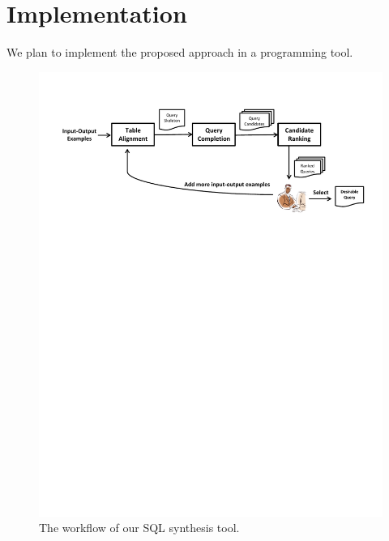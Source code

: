 
\section{Implementation}
\label{sec:implementation}

We plan to implement the proposed approach in a programming
tool.

\begin{figure}[t]
  \centering
  \includegraphics[scale=0.46]{workflow}
  \vspace*{-5.0ex}\caption {{\label{fig:workflow} The workflow of our SQL synthesis tool.
}}
\end{figure}


